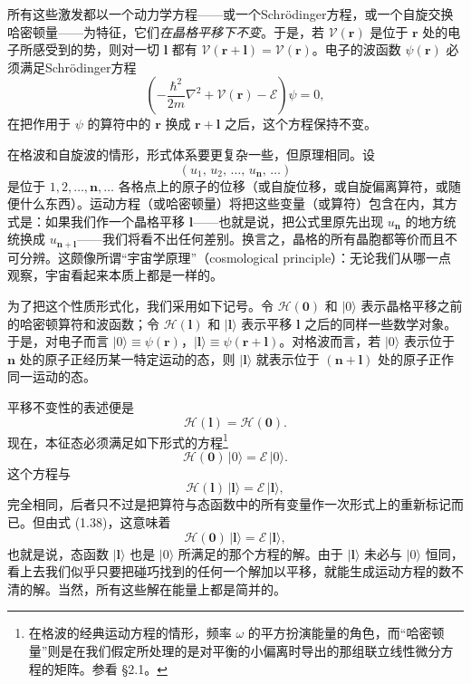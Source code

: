 所有这些激发都以一个动力学方程——或一个Schrödinger方程，或一个自旋交换哈密顿量——为特征，它们\emph{在晶格平移下不变}。于是，若 $\mathcal{V}(\mathbf{r})$ 是位于 $\mathbf{r}$ 处的电子所感受到的势，则对一切 $\mathbf{l}$ 都有 $\mathcal{V}(\mathbf{r}+\mathbf{l})=\mathcal{V}(\mathbf{r})$。电子的波函数 $\psi(\mathbf{r})$ 必须满足Schrödinger方程
\begin{equation*}
\left(-\frac{\hbar^{2}}{2m}\nabla^{2}+\mathcal{V}(\mathbf{r})-\mathcal{E}\right)\psi=0,
\tag{1.37}
\end{equation*}
在把作用于 $\psi$ 的算符中的 $\mathbf{r}$ 换成 $\mathbf{r}+\mathbf{l}$ 之后，这个方程保持不变。

在格波和自旋波的情形，形式体系要更复杂一些，但原理相同。设
\begin{equation*}
(u_1,\,u_2,\,\dots,\,u_{\mathbf{n}},\,\dots)
\end{equation*}
是位于 $1,2,\dots,\mathbf{n},\dots$ 各格点上的原子的位移（或自旋位移，或自旋偏离算符，或随便什么东西）。运动方程（或哈密顿量）将把这些变量（或算符）包含在内，其方式是：如果我们作一个晶格平移 $\mathbf{l}$——也就是说，把公式里原先出现 $u_{\mathbf{n}}$ 的地方统统换成 $u_{\mathbf{n}+\mathbf{l}}$——我们将看不出任何差别。换言之，晶格的所有晶胞都等价而且不可分辨。这颇像所谓“宇宙学原理”（cosmological principle）：无论我们从哪一点观察，宇宙看起来本质上都是一样的。

为了把这个性质形式化，我们采用如下记号。令 $\mathcal{H}(\mathbf{0})$ 和 $|0\rangle$ 表示晶格平移之前的哈密顿算符和波函数；令 $\mathcal{H}(\mathbf{l})$ 和 $|\mathbf{l}\rangle$ 表示平移 $\mathbf{l}$ 之后的同样一些数学对象。于是，对电子而言 $|0\rangle\equiv\psi(\mathbf{r})$，$|\mathbf{l}\rangle\equiv\psi(\mathbf{r}+\mathbf{l})$。对格波而言，若 $|0\rangle$ 表示位于 $\mathbf{n}$ 处的原子正经历某一特定运动的态，则 $|\mathbf{l}\rangle$ 就表示位于 $(\mathbf{n}+\mathbf{l})$ 处的原子正作同一运动的态。

平移不变性的表述便是
\begin{equation*}
\mathcal{H}(\mathbf{l})=\mathcal{H}(\mathbf{0}).
\tag{1.38}
\end{equation*}
现在，本征态必须满足如下形式的方程\footnote{在格波的经典运动方程的情形，频率 $\omega$ 的平方扮演能量的角色，而“哈密顿量”则是在我们假定所处理的是对平衡的小偏离时导出的那组联立线性微分方程的矩阵。参看 §2.1。}
\begin{equation*}
\mathcal{H}(\mathbf{0})\,|0\rangle=\mathcal{E}\,|0\rangle.
\tag{1.39}
\end{equation*}
这个方程与
\begin{equation*}
\mathcal{H}(\mathbf{l})\,|\mathbf{l}\rangle=\mathcal{E}\,|\mathbf{l}\rangle,
\tag{1.40}
\end{equation*}
完全相同，后者只不过是把算符与态函数中的所有变量作一次形式上的重新标记而已。但由式 (1.38)，这意味着
\begin{equation*}
\mathcal{H}(\mathbf{0})\,|\mathbf{l}\rangle=\mathcal{E}\,|\mathbf{l}\rangle,
\tag{1.41}
\end{equation*}
也就是说，态函数 $|\mathbf{l}\rangle$ 也是 $|0\rangle$ 所满足的那个方程的解。由于 $|\mathbf{l}\rangle$ 未必与 $|0\rangle$ 恒同，看上去我们似乎只要把碰巧找到的任何一个解加以平移，就能生成运动方程的数不清的解。当然，所有这些解在能量上都是简并的。

